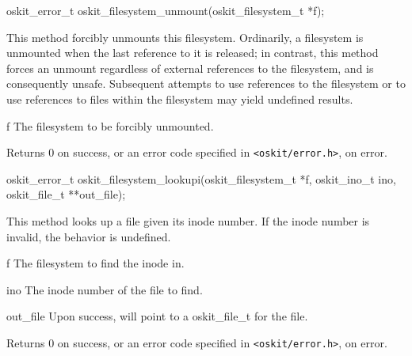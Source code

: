 \begin{apisyn}

	\funcproto oskit_error_t
	oskit_filesystem_unmount(oskit_filesystem_t *f); 
\end{apisyn}
\ostofs
\begin{apidesc}
	This method forcibly unmounts this
	filesystem.  Ordinarily, a filesystem is
	unmounted when the last reference to it is
	released; in contrast, this method forces
	an unmount regardless of external references
	to the filesystem, and is consequently unsafe.
	Subsequent attempts to use references to the
	filesystem or to use references to files within
	the filesystem may yield undefined results.
\end{apidesc}
\begin{apiparm}
	\item[f]
		The filesystem to be forcibly unmounted.
\end{apiparm}
\begin{apiret}
	Returns 0 on success, or an error code specified in
	{\tt <oskit/error.h>}, on error.
\end{apiret}


\begin{apisyn}

	\funcproto oskit_error_t
	oskit_filesystem_lookupi(oskit_filesystem_t *f, oskit_ino_t ino,
				\outparam oskit_file_t **out_file);
\end{apisyn}
\ostofs
\begin{apidesc}
	This method looks up a file given its inode number.
	If the inode number is invalid,
	the behavior is undefined.
\end{apidesc}
\begin{apiparm}
	\item[f]
		The filesystem to find the inode in.

	\item[ino]
		The inode number of the file to find.

	\item[out_file]
		Upon success, will point to a oskit_file_t for the file.
\end{apiparm}
\begin{apiret}
	Returns 0 on success, or an error code specified in
	{\tt <oskit/error.h>}, on error.
\end{apiret}


\label{oskit-file-intf}

